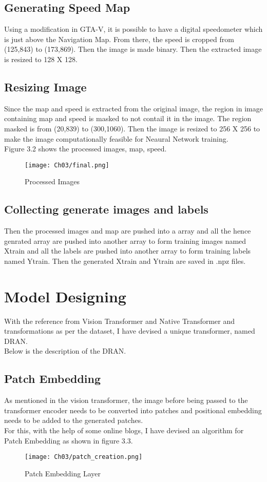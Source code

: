\subsection{Generating Speed Map}
Using a modification in GTA-V, it is possible to have a digital speedometer which is just above the Navigation Map. From there, the speed is cropped from (125,843) to (173,869). Then the image is made binary. Then the extracted image is resized to 128 X 128.

\subsection{Resizing Image}
Since the map and speed is extracted from the original image, the region in image containing map and speed is masked to not contail it in the image. The region masked is from (20,839) to (300,1060). Then the image is resized to 256 X 256 to make the image computationally feasible for Neaural Network training. 
\\
Figure 3.2 shows the processed images, map, speed.
\begin{figure}[h]
    \centering
    \texttt{[image: Ch03/final.png]}
    \caption{Processed Images}
    \label{figure:3}
\end{figure}
\FloatBarrier

\subsection{Collecting generate images and labels}
Then the processed images and map are pushed into a array and all the hence genrated array are pushed into another array to form training images named Xtrain and all the labels are pushed into another array to form training labels named Ytrain. Then the generated Xtrain and Ytrain are saved in .npz files.

\section{Model Designing}
With the reference from Vision Transformer\cite{dosovitskiy2021image} and Native Transformer\cite{2017arXiv170603762V} and transformations as per the dataset, I have devised a unique transformer, named DRAN.
\\
Below is the description of the DRAN. 

\subsection{Patch Embedding}
As mentioned in the vision transformer, the image before being passed to the transformer encoder needs to be converted into patches and positional embedding needs to be added to the generated patches.
\\
For this, with the help of some online blogs, I have devised an algorithm for Patch Embedding as shown in figure 3.3.
\begin{figure}[h]
    \centering
    \texttt{[image: Ch03/patch\_creation.png]}
    \caption{Patch Embedding Layer}
    \label{figure:4}
\end{figure}
\FloatBarrier

